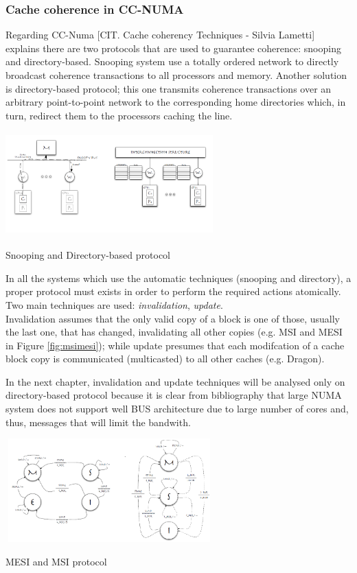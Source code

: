 \documentclass[a4paper,10pt]{article}
\makeatletter
\newenvironment{figurehere}{\def\@captype{figure}\vspace{2ex}}{\vspace{2ex}}
\makeatother
\begin{document}
\begin{multicols}{2}
\subsubsection{Cache coherence in CC-NUMA}
Regarding CC-Numa [CIT. Cache coherency Techniques - Silvia Lametti] explains there are two protocols that are used to guarantee coherence: snooping and directory-based. Snooping system use a totally ordered network to directly broadcast coherence transactions to all processors and memory. Another solution is directory-based protocol; this one transmits coherence transactions over an arbitrary point-to-point network to the corresponding home directories which, in turn, redirect them to the processors caching the line. 

\begin{figurehere}
 \centering
 \includegraphics[width=8cm, height=4cm]{./eps/SnoopeDir.png}
 \caption{Snooping and Directory-based protocol}
 \label{fig:s&d}
\end{figurehere}

In all the systems which use the automatic techniques (snooping and directory), a proper protocol must exists in order to perform the required actions atomically. Two main techniques are used: \emph{invalidation}, \emph{update}.\\
Invalidation assumes that the only valid copy of a block is one of those, usually the last one, that has changed, invalidating all other copies (e.g. MSI and MESI in Figure \ref{fig:msimesi}); while update presumes that each modifcation of a cache block copy is communicated (multicasted) to all other caches (e.g. Dragon).\par
\parindent 10mm In the next chapter, invalidation and update techniques will be analysed only on directory-based protocol because it is clear from bibliography that large NUMA system does not support well BUS architecture due to large number of cores and, thus, messages that will limit the bandwith.

\begin{figurehere}
 \centering
 \includegraphics[width=8cm, height=4cm]{./eps/msimesi.png}
 \caption{MESI and MSI protocol}
 \label{fig:msimesi}
\end{figurehere}


\end{multicols}
\end{document}
